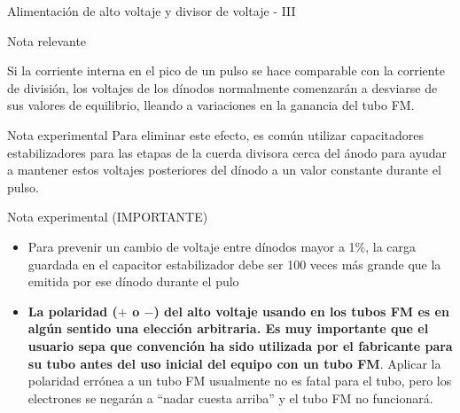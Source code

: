 \documentclass[a4paper,10pt]{beamer}
\begin{document}
\begin{frame}{Alimentación de alto voltaje y divisor de voltaje - III}
 \begin{block}{Nota relevante}
  \begin{justify}
  \footnotesize
   Si la corriente interna en el pico de un pulso se hace comparable con la corriente 
   de división, los voltajes de los dínodos normalmente comenzarán a desviarse de 
   sus valores de equilibrio, lleando a variaciones en la ganancia del tubo FM.
  \end{justify}
 \end{block}
  
  \begin{exampleblock}{Nota experimental}
  \footnotesize
   Para eliminar este efecto, es común utilizar capacitadores estabilizadores para 
   las etapas de la cuerda divisora cerca del ánodo para ayudar a mantener estos 
   voltajes posteriores del dínodo a un valor constante durante el pulso.
  \end{exampleblock}
  
  \begin{exampleblock}{Nota experimental (IMPORTANTE)}
   \footnotesize
   \begin{itemize}[<+->]
    \item \begin{justify}
          Para prevenir un cambio de voltaje entre dínodos mayor a 1\%, la carga 
          guardada en el capacitor estabilizador debe ser 100 veces más grande que 
          la emitida por ese dínodo durante el pulo
          \end{justify}
     \item \begin{justify}
          \textbf{La polaridad ($+$ o $-$) del alto voltaje usando en los tubos FM 
          es en algún sentido una elección arbitraria. Es muy importante que el usuario 
          sepa que convención ha sido utilizada por el fabricante para su tubo 
          antes del uso inicial del equipo con un tubo FM}. Aplicar la polaridad 
          errónea a un tubo FM usualmente no es fatal para el tubo, pero los 
          electrones se negarán a ``nadar cuesta arriba'' y el tubo FM no funcionará.
          \end{justify}
   \end{itemize}

  \end{exampleblock}

\end{frame}
\end{document}
